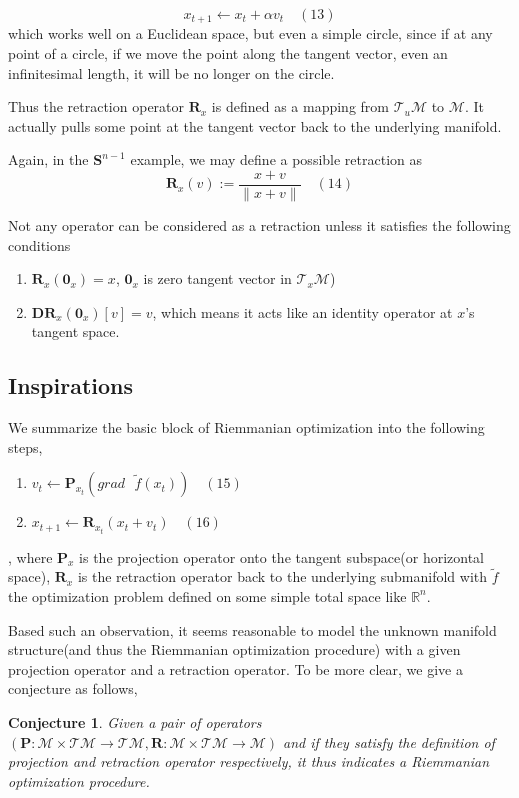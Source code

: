 \documentclass[letterpaper]{article}
\newtheorem{conj}{Conjecture}
\begin{document}
$$
    x_{t+1} \gets x_{t}+\alpha{\mathit{v_t}} \quad (13)
$$
which works well on a Euclidean space, but even a simple circle, since if at any point of a circle, if we move the point
along the tangent vector, even an infinitesimal length, it will be no longer on the circle.

Thus the retraction operator $\mathbf{R}_x$ is defined as a mapping from $\mathcal{T}_u\mathcal{M}$ to $\mathcal{M}$. It actually pulls some
point at the tangent vector back to the underlying manifold.

Again, in the $\mathbf{S}^{n-1}$ example, we may define a possible retraction as
$$
  \mathbf{R}_x(\mathit{v}):=\frac{x+\mathit{v}}{\|x+\mathit{v}\|} \quad (14)
$$

Not any operator can be considered as a retraction unless it satisfies the following conditions
\begin{enumerate}
  \item $\mathbf{R}_x(\mathbf{0}_x)=x$, $\mathbf{0}_x$ is zero tangent vector in $\mathcal{T}_x{\mathcal{M}}$)
  \item $\mathbf{D}\mathbf{R}_x(\mathbf{0}_x)[v]=v$, which means it acts like an identity operator at $x$'s tangent space.
\end{enumerate}

\subsection{Inspirations}
We summarize the basic block of Riemmanian optimization into the following steps,
\begin{enumerate}
  \item $\mathit{v}_t \gets \mathbf{P}_{x_t}(grad\text{ }\tilde{f}(x_t)) \quad (15)$
  \item $\mathit{x_{t+1} \gets \mathbf{R}_{x_t}(x_t+\mathit{v}_t)} \quad (16)$
\end{enumerate}
, where $\mathbf{P}_x$ is the projection operator onto the tangent subspace(or horizontal space), $\mathbf{R}_x$ is the retraction operator back to
the underlying submanifold with $\tilde{f}$ the optimization problem defined on some simple total space like $\mathbb{R}^n$.

Based such an observation, it seems reasonable to model the unknown manifold structure(and thus the Riemmanian optimization procedure) with a given projection operator and a retraction operator.
To be more clear, we give a conjecture as follows,
\begin{conj}
Given a pair of operators $(\mathbf{P}:\mathcal{M}\times\mathcal{T}\mathcal{M}\to\mathcal{T}\mathcal{M},\mathbf{R}:\mathcal{M}\times\mathcal{T}\mathcal{M}\to\mathcal{M})$ and if they satisfy the definition of projection and retraction operator respectively, it thus indicates a Riemmanian optimization procedure.
\end{conj}
\end{document}
